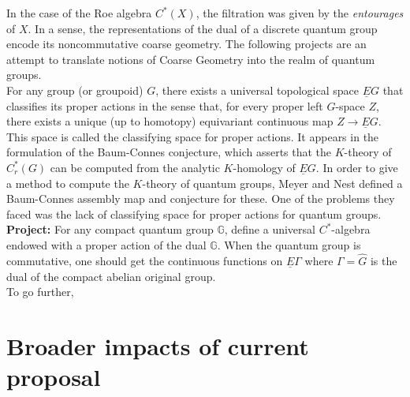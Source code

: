 In the case of the Roe algebra $C^*(X)$, the filtration was given by the \textit{entourages} of $X$. In a sense, the representations of the dual of a discrete quantum group encode its noncommutative coarse geometry. The following projects are an attempt to translate notions of Coarse Geometry into the realm of quantum groups. \\

For any group (or groupoid) $G$, there exists a universal topological space $\underline E G$ that classifies its proper actions in the sense that, for every proper left $G$-space $Z$, there exists a unique (up to homotopy) equivariant continuous map $Z \rightarrow \underline E G$. This space is called the classifying space for proper actions. It appears in the formulation of the Baum-Connes conjecture, which asserts that the $K$-theory of $C^*_r(G)$ can be computed from the analytic $K$-homology of $\underline E G$. In order to give a method to compute the $K$-theory of quantum groups, Meyer and Nest defined a Baum-Connes assembly map and conjecture for these. One of the problems they faced was the lack of classifying space for proper actions for quantum groups. \\

\textbf{Project:} For any compact quantum group $\mathbb G$, define a universal $C^*$-algebra endowed with a proper action of the dual $\hat {\mathbb G}$. When the quantum group is commutative, one should get the continuous functions on $\underline E \Gamma$ where $\Gamma= \hat G$ is the dual of the compact abelian original group.\\

To go further, 

\section{Broader impacts of current proposal}




      
